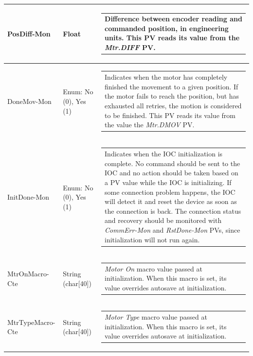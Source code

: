 \documentclass[openany]{article}
\begin{document}
\begin{longtable}{| m{4.5cm} m{2.5cm}  m{8.5cm} |}
        PosDiff-Mon & Float & \begin{tabular}{@{}m{6cm}@{}}
                Difference between encoder reading and commanded position, in engineering units. This PV reads its value from the \emph{Mtr.DIFF} PV.
            \end{tabular} \hypertarget{pv:done-mov-mon}{}\\ \hline
        DoneMov-Mon & Enum: No (0), Yes (1) & \begin{tabular}{@{}m{6cm}@{}}
                Indicates when the motor has completely finished the movement to a given position. If the motor fails to reach the position, but has exhausted all retries, the motion is considered to be finished. This PV reads its value from the value the \emph{Mtr.DMOV} PV.
            \end{tabular} \hypertarget{pv:mtr-on-macro-cte}{}\\ \hline
        InitDone-Mon & Enum: No (0), Yes (1) & \begin{tabular}{@{}m{6cm}@{}}
                Indicates when the IOC initialization is complete. No command should be sent to the IOC and no action should be taken based on a PV value while the IOC is initializing. If some connection problem happens, the IOC will detect it and reset the device as soon as the connection is back. The connection status and recovery should be monitored with \emph{CommErr-Mon} and \emph{RstDone-Mon} PVs, since initialization will not run again.
            \end{tabular} \hypertarget{pv:mtr-on-macro-cte}{}\\ \hline
        MtrOnMacro-Cte & String (char[40]) & \begin{tabular}{@{}m{6cm}@{}}
                \emph{Motor On} macro value passed at initialization. When this macro is set, its value overrides autosave at initialization.
            \end{tabular} \hypertarget{pv:mtr-type-macro-cte}{}\\ \hline
        MtrTypeMacro-Cte & String (char[40]) & \begin{tabular}{@{}m{6cm}@{}}
                \emph{Motor Type} macro value passed at initialization. When this macro is set, its value overrides autosave at initialization.
            \end{tabular} \hypertarget{pv:amp-gain-macro-cte}{}\\ \hline

\end{longtable}
\end{document}

